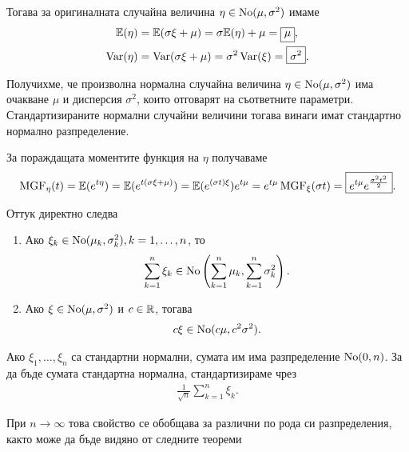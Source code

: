\documentclass[numbers=endperiod, bibliography=totocnumbered]{scrartcl}
\begin{document}
Тогава за оригиналната случайна величина \( \eta \in \operatorname{No}(\mu, \sigma^2) \) имаме
\begin{align*}
  \mathbb{E}(\eta) &= \mathbb{E}(\sigma \xi + \mu) = \sigma \mathbb{E}(\eta) + \mu = \boxed{\mu}, \\
  \operatorname{Var}(\eta) &= \operatorname{Var}(\sigma \xi + \mu) = \sigma^2 \operatorname{Var}(\xi) = \boxed{\sigma^2}.
\end{align*}

Получихме, че произволна нормална случайна величина \( \eta \in \operatorname{No}(\mu, \sigma^2) \) има очакване \( \mu \) и дисперсия \( \sigma^2 \), които отговарят на съответните параметри. Стандартизираните нормални случайни величини тогава винаги имат стандартно нормално разпределение.

За пораждащата моментите функция на \( \eta \) получаваме
\begin{align*}
  \operatorname{MGF}_\eta(t)
  =
  \mathbb{E}(e^{t\eta})
  =
  \mathbb{E}(e^{t(\sigma\xi + \mu)})
  =
  \mathbb{E}(e^{(\sigma t) \xi}) e^{t\mu}
  =
  e^{t\mu} \operatorname{MGF}_\xi(\sigma t)
  =
  \boxed{e^{t\mu} e^{\frac {\sigma^2 t^2} 2}}.
\end{align*}

Оттук директно следва
\begin{proposition}\label{thm:normal_distribution_is_stable}
  \mbox{}
  \begin{enumerate}
    \item Ако \( \xi_k \in \operatorname{No}(\mu_k, \sigma_k^2), k = 1, \ldots, n \), то
    \begin{align*}
      \sum_{k=1}^n \xi_k \in \operatorname{No}\left( \sum_{k=1}^n \mu_k, \sum_{k=1}^n \sigma_k^2 \right).
    \end{align*}

    \item Ако \( \xi \in \operatorname{No}(\mu, \sigma^2) \) и \( c \in \mathbb{R} \), тогава
    \begin{align*}
      c \xi \in \operatorname{No}(c \mu, c^2 \sigma^2).
    \end{align*}
  \end{enumerate}
\end{proposition}

Ако \( \xi_1, \ldots, \xi_n \) са стандартни нормални, сумата им има разпределение \( \operatorname{No}(0, n) \). За да бъде сумата стандартна нормална, стандартизираме чрез
\begin{align*}
  \frac 1 {\sqrt n} \sum_{k=1}^n \xi_k.
\end{align*}

При \( n \to \infty \) това свойство се обобщава за различни по рода си разпределения, както може да бъде видяно от следните теореми
\end{document}
